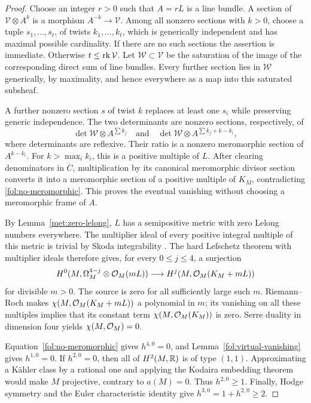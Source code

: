 \begin{proof}
Choose an integer $r>0$ such that $A=rL$ is a line bundle.  A section of
$\mathcal V\otimes A^k$ is a morphism $A^{-k}\to\mathcal V$.  Among
all nonzero sections with $k>0$, choose a tuple
$s_1,\ldots,s_t$, of twists $k_1,\ldots,k_t$, which is generically
independent and has maximal possible cardinality.  If there are no such
sections the assertion is immediate.  Otherwise $t\leq\operatorname{rk}\mathcal V$.
Let $\mathcal W\subset\mathcal V$ be the saturation of the image of the
corresponding direct sum of line bundles.  Every further section lies in
$\mathcal W$ generically, by maximality, and hence everywhere as a map
into this saturated subsheaf.

A further nonzero section $s$ of twist $k$ replaces at least one $s_i$
while preserving generic independence.  The two determinants are nonzero
sections, respectively, of
\[
 \det\mathcal W\otimes A^{\sum k_j}
 \quad\text{and}\quad
 \det\mathcal W\otimes A^{\sum k_j+k-k_i},
\]
where determinants are reflexive.  Their ratio is a nonzero meromorphic
section of $A^{k-k_i}$.  For $k>\max_i k_i$, this is a positive multiple
of $L$.  After clearing denominators in $C$, multiplication by its
canonical meromorphic divisor section converts it into a meromorphic
section of a positive multiple of $K_M$, contradicting
\eqref{fol:no-meromorphic}.  This proves the eventual vanishing without
choosing a meromorphic frame of $A$.

By Lemma~\ref{met:zero-lelong}, $L$ has a semipositive metric with zero
Lelong numbers everywhere.  The multiplier ideal of every positive
integral multiple of this metric is trivial by Skoda integrability
\cite{SkodaIntegrability}.  The hard Lefschetz theorem with multiplier
ideals \cite[Theorem~0.1]{DPSHardLefschetz} therefore gives, for every
$0\leq j\leq4$, a surjection
\[
 H^0(M,\Omega_M^{4-j}\otimes\mathcal{O}_M(mL))
 \longrightarrow H^j(M,\mathcal{O}_M(K_M+mL))
\]
for divisible $m>0$.  The source is zero for all sufficiently large such
$m$.  Riemann--Roch makes $\chi(M,\mathcal{O}_M(K_M+mL))$ a polynomial in $m$;
its vanishing on all these multiples implies that its constant term
$\chi(M,\mathcal{O}_M(K_M))$ is zero.  Serre duality in dimension four yields
$\chi(M,\mathcal{O}_M)=0$.

Equation~\eqref{fol:no-meromorphic} gives $h^{4,0}=0$, and
Lemma~\ref{fol:virtual-vanishing} gives $h^{1,0}=0$.  If $h^{2,0}=0$,
then all of $H^2(M,\mathbb{R})$ is of type $(1,1)$.  Approximating a K\"ahler
class by a rational one and applying the Kodaira embedding theorem would
make $M$ projective, contrary to $a(M)=0$.  Thus $h^{2,0}\geq1$.
Finally, Hodge symmetry and the Euler characteristic identity give
$h^{3,0}=1+h^{2,0}\geq2$.
\end{proof}

